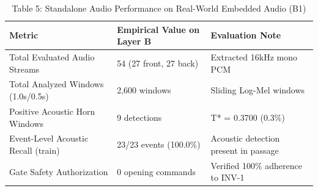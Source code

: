 \begin{table}[t]
\centering
\caption{Table 5: Standalone Audio Performance on Real-World Embedded Audio (B1)}
\label{tab:table05_audio_layerb_performance}
\begin{tabular}{lll}
\hline
Metric & Empirical Value on Layer B & Evaluation Note \\
\hline
Total Evaluated Audio Streams & 54 (27 front, 27 back) & Extracted 16kHz mono PCM \\
Total Analyzed Windows (1.0s/0.5s) & 2,600 windows & Sliding Log-Mel windows \\
Positive Acoustic Horn Windows & 9 detections & T* = 0.3700 (0.3\%) \\
Event-Level Acoustic Recall (train) & 23/23 events (100.0\%) & Acoustic detection present in passage \\
Gate Safety Authorization & 0 opening commands & Verified 100\% adherence to INV-1 \\
\hline
\end{tabular}
\end{table}
